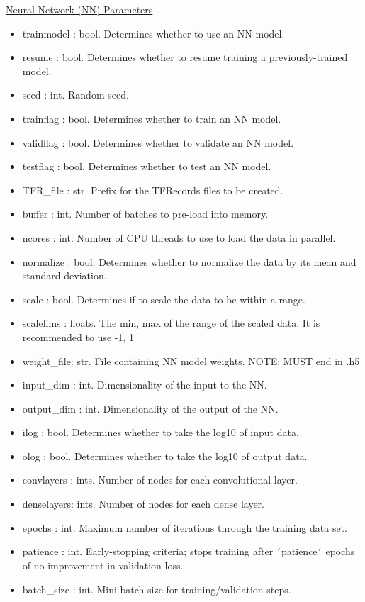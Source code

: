 \documentclass[letterpaper, 12pt]{article}
\begin{document}
\noindent \underline{Neural Network (NN) Parameters}
\begin{itemize}
\item trainmodel : bool. Determines whether to use an NN model.
\item resume     : bool. Determines whether to resume training a 
                         previously-trained model.
\item seed       : int.  Random seed.
\item trainflag  : bool. Determines whether to train    an NN model.
\item validflag  : bool. Determines whether to validate an NN model.
\item testflag   : bool. Determines whether to test     an NN model.

\item TFR\_file   : str.  Prefix for the TFRecords files to be created.
\item buffer     : int.  Number of batches to pre-load into memory.
\item ncores     : int.  Number of CPU threads to use to load the data in 
                         parallel.

\item normalize  : bool. Determines whether to normalize the data by its mean 
                         and standard deviation.
\item scale      : bool. Determines if to scale the data to be within a range.
\item scalelims  : floats. The min, max of the range of the scaled data.
                           It is recommended to use -1, 1

\item weight\_file: str.  File containing NN model weights.
                   NOTE: MUST end in .h5
\item input\_dim  : int.  Dimensionality of the input  to the NN.
\item output\_dim : int.  Dimensionality of the output of the NN.
\item ilog       : bool. Determines whether to take the log10 of input  data.
\item olog       : bool. Determines whether to take the log10 of output data.

\item convlayers : ints. Number of nodes for each convolutional layer.
\item denselayers: ints. Number of nodes for each dense         layer.
\item epochs     : int.  Maximum number of iterations through the training 
                         data set.
\item patience   : int.  Early-stopping criteria; stops training after 
                         \texttt{`}patience\texttt{`} epochs of no improvement 
                         in validation loss.
\item batch\_size : int.  Mini-batch size for training/validation steps.


\end{itemize}
\end{document}
